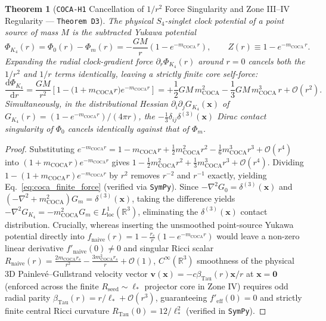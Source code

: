 \documentclass[11pt,a4paper]{article}
\newtheorem{theorem}{Theorem}[section]
\theoremstyle{remark}
\begin{document}
\begin{theorem}[\texttt{COCA-H1} Cancellation of $1/r^2$ Force Singularity and Zone III--IV Regularity --- \texttt{Theorem D3}]
\label{thm:d3}
The physical $S_4$-singlet clock potential of a point source of mass $M$ is the subtracted Yukawa potential
\begin{equation}
  \Phi_{K_4}(r) = \Phi_0(r) - \Phi_m(r) = -\frac{GM}{r}\!\left(1 - e^{-m_{\mathrm{COCA}}\,r}\right), \qquad Z(r) \equiv 1 - e^{-m_{\mathrm{COCA}}\,r}.
  \label{eq:phi_k4_yukawa}
\end{equation}
Expanding the radial clock-gradient force $\partial_r\Phi_{K_4}(r)$ around $r = 0$ cancels both the $1/r^2$ and $1/r$ terms identically, leaving a strictly finite core self-force:
\begin{equation}
  \frac{\mathrm{d}\Phi_{K_4}}{\mathrm{d}r} = \frac{GM}{r^2}\!\left[1 - \bigl(1 + m_{\mathrm{COCA}}r\bigr)e^{-m_{\mathrm{COCA}}r}\right] = +\frac{1}{2}GM\,m_{\mathrm{COCA}}^2 - \frac{1}{3}GM\,m_{\mathrm{COCA}}^3\,r + \mathcal{O}(r^2).
  \label{eq:coca_finite_force}
\end{equation}
Simultaneously, in the distributional Hessian $\partial_i\partial_j G_{K_4}(\mathbf{x})$ of $G_{K_4}(r) = (1 - e^{-m_{\mathrm{COCA}}r})/(4\pi r)$, the $-\frac{1}{3}\delta_{ij}\delta^{(3)}(\mathbf{x})$ Dirac contact singularity of $\Phi_0$ cancels identically against that of $\Phi_m$.
\end{theorem}

\begin{proof}
Substituting $e^{-m_{\mathrm{COCA}}r} = 1 - m_{\mathrm{COCA}}r + \frac{1}{2}m_{\mathrm{COCA}}^2 r^2 - \frac{1}{6}m_{\mathrm{COCA}}^3 r^3 + \mathcal{O}(r^4)$ into $(1 + m_{\mathrm{COCA}}r)e^{-m_{\mathrm{COCA}}r}$ gives $1 - \frac{1}{2}m_{\mathrm{COCA}}^2 r^2 + \frac{1}{3}m_{\mathrm{COCA}}^3 r^3 + \mathcal{O}(r^4)$. Dividing $1 - (1 + m_{\mathrm{COCA}}r)e^{-m_{\mathrm{COCA}}r}$ by $r^2$ removes $r^{-2}$ and $r^{-1}$ exactly, yielding Eq.~\eqref{eq:coca_finite_force} (verified via \texttt{SymPy}). Since $-\nabla^2 G_0 = \delta^{(3)}(\mathbf{x})$ and $(-\nabla^2 + m_{\mathrm{COCA}}^2)G_m = \delta^{(3)}(\mathbf{x})$, taking the difference yields $-\nabla^2 G_{K_4} = -m_{\mathrm{COCA}}^2 G_m \in L^1_{\mathrm{loc}}(\mathbb{R}^3)$, eliminating the $\delta^{(3)}(\mathbf{x})$ contact distribution. Crucially, whereas inserting the unsmoothed point-source Yukawa potential directly into $f_{\mathrm{naive}}(r) = 1 - \frac{r_s}{r}(1 - e^{-m_{\mathrm{COCA}}r})$ would leave a non-zero linear derivative $f'_{\mathrm{naive}}(0) \neq 0$ and singular Ricci scalar $R_{\mathrm{naive}}(r) = \frac{2m_{\mathrm{COCA}}r_s}{r^2} - \frac{3m_{\mathrm{COCA}}^2 r_s}{r} + \mathcal{O}(1)$, $C^\infty(\mathbb{R}^3)$ smoothness of the physical 3D Painlev\'e--Gullstrand velocity vector $\mathbf{v}(\mathbf{x}) = -c\beta_{\mathrm{Tau}}(r)\mathbf{x}/r$ at $\mathbf{x} = \mathbf{0}$ (enforced across the finite $R_{\mathrm{seed}} \sim \ell_*$ projector core in Zone IV) requires odd radial parity $\beta_{\mathrm{Tau}}(r) = r/\ell_* + \mathcal{O}(r^3)$, guaranteeing $f'_{\mathrm{eff}}(0) = 0$ and strictly finite central Ricci curvature $R_{\mathrm{Tau}}(0) = 12/\ell_*^2$ (verified in \texttt{SymPy}).
\end{proof}
\end{document}
